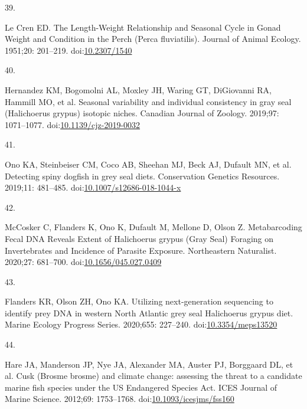 \documentclass[
  10pt,
]{article}
\newlength{\cslhangindent}
\newlength{\csllabelwidth}
\newlength{\cslentryspacingunit} %
\newenvironment{CSLReferences}[2] %
 {%
  \setlength{\parindent}{0pt}
  \ifodd #1
  \let\oldpar\par
  \def\par{\hangindent=\cslhangindent\oldpar}
  \fi
  \setlength{\parskip}{#2\cslentryspacingunit}
 }%
 {}
\newcommand{\CSLLeftMargin}[1]{\parbox[t]{\csllabelwidth}{#1}}
\newcommand{\CSLRightInline}[1]{\parbox[t]{\linewidth - \csllabelwidth}{#1}\break}
\begin{document}
\begin{CSLReferences}{0}{0}
\leavevmode{}%
\CSLLeftMargin{39. }%
\CSLRightInline{Le Cren ED. The {Length}-{Weight} {Relationship} and {Seasonal} {Cycle} in {Gonad} {Weight} and {Condition} in the {Perch} ({Perca} fluviatilis). Journal of Animal Ecology. 1951;20: 201--219. doi:\href{https://doi.org/10.2307/1540}{10.2307/1540}}

\leavevmode{}%
\CSLLeftMargin{40. }%
\CSLRightInline{Hernandez KM, Bogomolni AL, Moxley JH, Waring GT, DiGiovanni RA, Hammill MO, et al. Seasonal variability and individual consistency in gray seal ({Halichoerus} grypus) isotopic niches. Canadian Journal of Zoology. 2019;97: 1071--1077. doi:\href{https://doi.org/10.1139/cjz-2019-0032}{10.1139/cjz-2019-0032}}

\leavevmode{}%
\CSLLeftMargin{41. }%
\CSLRightInline{Ono KA, Steinbeiser CM, Coco AB, Sheehan MJ, Beck AJ, Dufault MN, et al. Detecting spiny dogfish in grey seal diets. Conservation Genetics Resources. 2019;11: 481--485. doi:\href{https://doi.org/10.1007/s12686-018-1044-x}{10.1007/s12686-018-1044-x}}

\leavevmode{}%
\CSLLeftMargin{42. }%
\CSLRightInline{McCosker C, Flanders K, Ono K, Dufault M, Mellone D, Olson Z. Metabarcoding {Fecal} {DNA} {Reveals} {Extent} of {Halichoerus} grypus ({Gray} {Seal}) {Foraging} on {Invertebrates} and {Incidence} of {Parasite} {Exposure}. Northeastern Naturalist. 2020;27: 681--700. doi:\href{https://doi.org/10.1656/045.027.0409}{10.1656/045.027.0409}}

\leavevmode{}%
\CSLLeftMargin{43. }%
\CSLRightInline{Flanders KR, Olson ZH, Ono KA. Utilizing next-generation sequencing to identify prey {DNA} in western {North} {Atlantic} grey seal {Halichoerus} grypus diet. Marine Ecology Progress Series. 2020;655: 227--240. doi:\href{https://doi.org/10.3354/meps13520}{10.3354/meps13520}}

\leavevmode{}%
\CSLLeftMargin{44. }%
\CSLRightInline{Hare JA, Manderson JP, Nye JA, Alexander MA, Auster PJ, Borggaard DL, et al. {Cusk (Brosme brosme) and climate change: assessing the threat to a candidate marine fish species under the US Endangered Species Act}. ICES Journal of Marine Science. 2012;69: 1753--1768. doi:\href{https://doi.org/10.1093/icesjms/fss160}{10.1093/icesjms/fss160}}


\end{CSLReferences}
\end{document}
